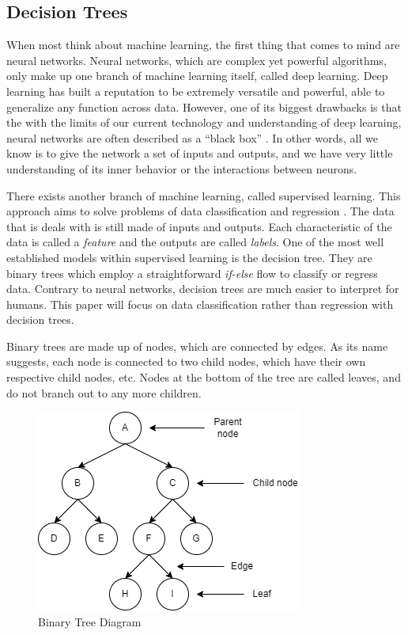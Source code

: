 \documentclass[12pt]{article}
\begin{document}
\subsection{Decision Trees}

When most think about machine learning, the first thing that comes to mind are neural networks. Neural networks, which are complex yet powerful algorithms, only make up one branch of machine learning itself, called deep learning. Deep learning has built a reputation to be extremely versatile and powerful, able to generalize any function across data. However, one of its biggest drawbacks is that the with the limits of our current technology and understanding of deep learning, neural networks are often described as a ``black box'' \cite{Buhrmester_Munch_Arens_2019}. In other words, all we know is to give the network a set of inputs and outputs, and we have very little understanding of its inner behavior or the interactions between neurons.

There exists another branch of machine learning, called supervised learning. This approach aims to solve problems of data classification and regression \cite{Supervised_unsupervised_learning}. The data that is deals with is still made of inputs and outputs. Each characteristic of the data is called a \textit{feature} and the outputs are called \textit{labels}. One of the most well established models within supervised learning is the decision tree. They are binary trees which employ a straightforward \textit{if-else} flow to classify or regress data. Contrary to neural networks, decision trees are much easier to interpret for humans. This paper will focus on data classification rather than regression with decision trees.

Binary trees are made up of nodes, which are connected by edges. As its name suggests, each node is connected to two child nodes, which have their own respective child nodes, etc. Nodes at the bottom of the tree are called leaves, and do not branch out to any more children.

\begin{figure}[H]
    \centering
    \includegraphics[scale=0.6]{figs/binary_tree.png}
    \caption{Binary Tree Diagram}
    \label{fig:binarytree}
\end{figure}
\end{document}
